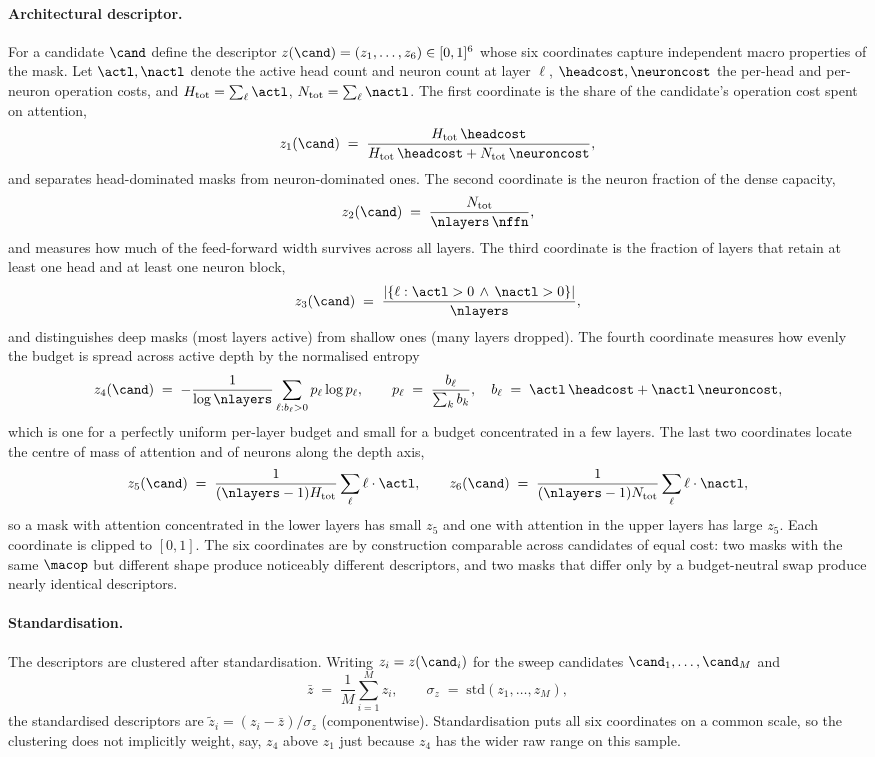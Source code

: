 \paragraph{Architectural descriptor.}
For a candidate $\cand$ define the descriptor $z(\cand) = (z_1, \ldots, z_6) \in [0, 1]^6$ whose six coordinates capture independent macro properties of the mask. Let $\actl, \nactl$ denote the active head count and neuron count at layer $\ell$, $\headcost, \neuroncost$ the per-head and per-neuron operation costs, and $H_{\mathrm{tot}} = \sum_\ell \actl$, $N_{\mathrm{tot}} = \sum_\ell \nactl$. The first coordinate is the share of the candidate's operation cost spent on attention,
\[
z_1(\cand) \;=\; \frac{H_{\mathrm{tot}} \,\headcost}{H_{\mathrm{tot}} \,\headcost + N_{\mathrm{tot}} \,\neuroncost},
\]
and separates head-dominated masks from neuron-dominated ones. The second coordinate is the neuron fraction of the dense capacity,
\[
z_2(\cand) \;=\; \frac{N_{\mathrm{tot}}}{\nlayers \, \nffn},
\]
and measures how much of the feed-forward width survives across all layers. The third coordinate is the fraction of layers that retain at least one head and at least one neuron block,
\[
z_3(\cand) \;=\; \frac{|\{\ell : \actl > 0 \,\wedge\, \nactl > 0\}|}{\nlayers},
\]
and distinguishes deep masks (most layers active) from shallow ones (many layers dropped). The fourth coordinate measures how evenly the budget is spread across active depth by the normalised entropy
\[
z_4(\cand) \;=\; -\frac{1}{\log \nlayers} \sum_{\ell : b_\ell > 0} p_\ell \log p_\ell, \qquad p_\ell \;=\; \frac{b_\ell}{\sum_k b_k}, \quad b_\ell \;=\; \actl \,\headcost + \nactl \,\neuroncost,
\]
which is one for a perfectly uniform per-layer budget and small for a budget concentrated in a few layers. The last two coordinates locate the centre of mass of attention and of neurons along the depth axis,
\[
z_5(\cand) \;=\; \frac{1}{(\nlayers - 1) H_{\mathrm{tot}}} \sum_{\ell} \ell \cdot \actl, \qquad
z_6(\cand) \;=\; \frac{1}{(\nlayers - 1) N_{\mathrm{tot}}} \sum_{\ell} \ell \cdot \nactl,
\]
so a mask with attention concentrated in the lower layers has small $z_5$ and one with attention in the upper layers has large $z_5$. Each coordinate is clipped to $[0,1]$. The six coordinates are by construction comparable across candidates of equal cost: two masks with the same $\macop$ but different shape produce noticeably different descriptors, and two masks that differ only by a budget-neutral swap produce nearly identical descriptors.

\paragraph{Standardisation.}
The descriptors are clustered after standardisation. Writing $z_i = z(\cand_i)$ for the sweep candidates $\cand_1, \ldots, \cand_M$ and
\[
\bar z \;=\; \frac{1}{M} \sum_{i=1}^{M} z_i, \qquad \sigma_z \;=\; \mathrm{std}(z_1, \ldots, z_M),
\]
the standardised descriptors are $\tilde z_i = (z_i - \bar z) / \sigma_z$ (componentwise). Standardisation puts all six coordinates on a common scale, so the clustering does not implicitly weight, say, $z_4$ above $z_1$ just because $z_4$ has the wider raw range on this sample.

